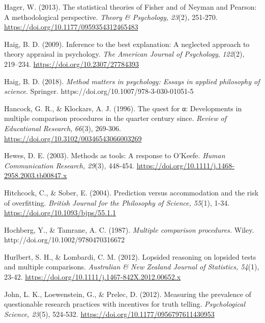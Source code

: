 \documentclass[authordate, empirical]{jote-new-article}
\begin{document}
	Hager, W. (2013). The statistical theories of Fisher and of Neyman and Pearson: A methodological perspective. \emph{Theory \& Psychology, 23}(2)\emph{,} 251-270. \href{https://doi.org/10.1177/0959354312465483}{https://doi.org/10.1177/0959354312465483}



	Haig, B. D. (2009). Inference to the best explanation: A neglected approach to theory appraisal in psychology. \emph{The American Journal of Psychology}, \emph{122}(2), 219--234. \href{https://doi.org/10.2307/27784393}{https://doi.org/10.2307/27784393}



	Haig, B. D. (2018). \emph{Method matters in psychology: Essays in applied philosophy of science}. Springer. https://doi.org/10.1007/978-3-030-01051-5



	Hancock, G. R., \& Klockars, A. J. (1996). The quest for α: Developments in multiple comparison procedures in the quarter century since. \emph{Review of Educational Research}, \emph{66}(3), 269-306. \href{https://doi.org/10.3102/00346543066003269}{https://doi.org/10.3102/00346543066003269}



	Hewes, D. E. (2003). Methods as tools: A response to O'Keefe. \emph{Human Communication Research, 29}(3)\emph{,} 448-454. \href{https://doi.org/10.1111/j.1468-2958.2003.tb00847.x}{https://doi.org/10.1111/j.1468-2958.2003.tb00847.x}



	Hitchcock, C., \& Sober, E. (2004). Prediction versus accommodation and the risk of overfitting. \emph{British Journal for the Philosophy of Science, 55}(1), 1-34. \href{https://doi.org/10.1093/bjps/55.1.1}{https://doi.org/10.1093/bjps/55.1.1}



	Hochberg, Y., \& Tamrane, A. C. (1987). \emph{Multiple comparison procedures.} Wiley. http://doi.org/10.1002/9780470316672



	Hurlbert, S. H., \& Lombardi, C. M. (2012). Lopsided reasoning on lopsided tests and multiple comparisons. \emph{Australian \& New Zealand Journal of Statistics, 54}(1), 23-42. \href{https://doi.org/10.1111/j.1467-842X.2012.00652.x}{https://doi.org/10.1111/j.1467-842X.2012.00652.x}



	John, L. K., Loewenstein, G., \& Prelec, D. (2012). Measuring the prevalence of questionable research practices with incentives for truth telling. \emph{Psychological Science, 23}(5), 524-532. \href{https://doi.org/10.1177/0956797611430953}{https://doi.org/10.1177/0956797611430953}
\end{document}
